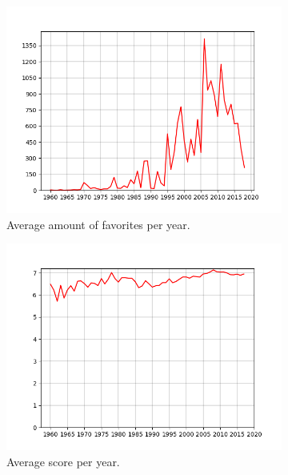 \begin{figure}
	\centering
	\begin{subfigure}{.55\columnwidth}
		\centering
		\includegraphics[width=\columnwidth]{graphics/avgFavorites.png}
		\caption{Average amount of favorites per year.}
		\label{fig:avgFavorites}
	\end{subfigure}%
	\begin{subfigure}{.55\columnwidth}
		\centering
		\includegraphics[width=\columnwidth]{graphics/avgScores.png}
		\caption{Average score per year.}
		\label{fig:avgScores}
	\end{subfigure}
	\begin{subfigure}{.55\columnwidth}
		\centering

\end{subfigure}
\end{figure}
